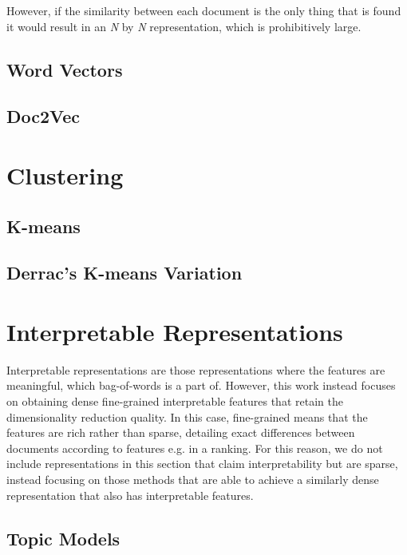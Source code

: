 
However, if the similarity between each document is the only thing that is found it would result in an \textit {N} by \textit {N} representation, which is prohibitively large.


\subsection{Word Vectors}\label{bg:WordVectors}



\subsection{Doc2Vec}





\section{Clustering}\label{bg:clustering}

\subsection{K-means}

\subsection{Derrac's K-means Variation}

\section{Interpretable Representations}

Interpretable representations are those representations where the features are meaningful, which bag-of-words is a part of. However, this work instead focuses on obtaining dense fine-grained interpretable features that retain the dimensionality reduction quality. In this case, fine-grained means that the features are rich rather than sparse, detailing exact differences between documents according to features e.g. in a ranking. For this reason, we do not include representations in this section that claim interpretability but are sparse, instead focusing on those methods that are able to achieve a similarly dense representation that also has interpretable features.

\subsection{Topic Models}\label{bg:TopicModels}

